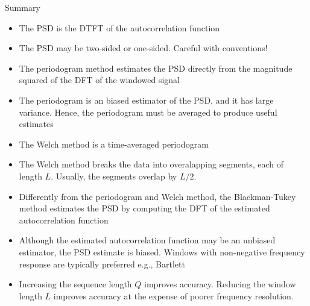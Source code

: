 \documentclass[10pt]{beamer}
\begin{document}
%
\begin{frame}{Summary}
	\begin{itemize}
		\item The PSD is the DTFT of the autocorrelation function
		\item The PSD may be two-sided or one-sided. Careful with conventions!
		\item The periodogram method estimates the PSD directly from the magnitude squared of the DFT of the windowed signal
		\item The periodogram is an biased estimator of the PSD, and it has large variance. Hence, the periodogram must be averaged to produce useful estimates
		\item The Welch method is a time-averaged periodogram
		\item The Welch method breaks the data into overalapping segments, each of length $L$. Usually, the segments overlap by $L/2$.
		\item Differently from the periodogram and Welch method, the Blackman-Tukey method estimates the PSD by computing the DFT of the estimated autocorrelation function
		\item Although the estimated autocorrelation function may be an unbiased estimator, the PSD estimate is biased. Windows with non-negative frequency response are typically preferred e.g., Bartlett
		\item Increasing the sequence length $Q$ improves accuracy. Reducing the window length $L$ improves accuracy at the expense of poorer frequency resolution.
	\end{itemize}
\end{frame}
\end{document}
